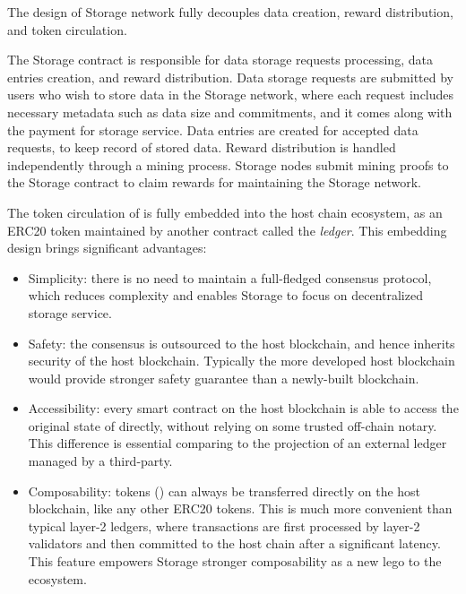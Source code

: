 The design of \projabbrev Storage network fully decouples data creation, reward distribution, and token circulation.

The \projabbrev Storage contract is responsible for data storage requests processing, data entries creation, and reward distribution. 
Data storage requests are submitted by users who wish to store data in the \projabbrev Storage network,
where each request includes necessary metadata such as data size and commitments,
and it comes along with the payment for storage service.
Data entries are created for accepted data requests, to keep record of stored data.
Reward distribution is handled independently through a mining process.
Storage nodes submit mining proofs to the \projabbrev Storage contract to claim rewards for maintaining the \projabbrev Storage network.


The token circulation of \projabbrev is fully embedded into the host chain ecosystem,
as an ERC20 token maintained by another contract called the \emph{\token ledger}.
% 
This embedding design brings significant advantages:
\begin{itemize}
	\item Simplicity: there is no need to maintain a full-fledged  consensus protocol,
	which reduces complexity and enables \projabbrev Storage to focus on decentralized storage service.

	\item Safety: the consensus is outsourced to the host blockchain, and hence inherits security of the host blockchain. 
	Typically the more developed host blockchain would provide stronger safety guarantee than a newly-built blockchain.

	\item Accessibility: every smart contract on the host blockchain is able to access the original state of \project directly, without relying on some trusted off-chain notary. This difference is essential comparing to the projection of an external ledger managed by a third-party.

	\item Composability: \projabbrev tokens (\token) can always be transferred directly on the host blockchain, like any other ERC20 tokens. 
	This is much more convenient than typical layer-2 ledgers, where transactions are first processed by layer-2 validators and then committed to the host chain after a significant latency.
	This feature empowers \projabbrev Storage stronger composability as a new lego to the ecosystem.
\end{itemize}


